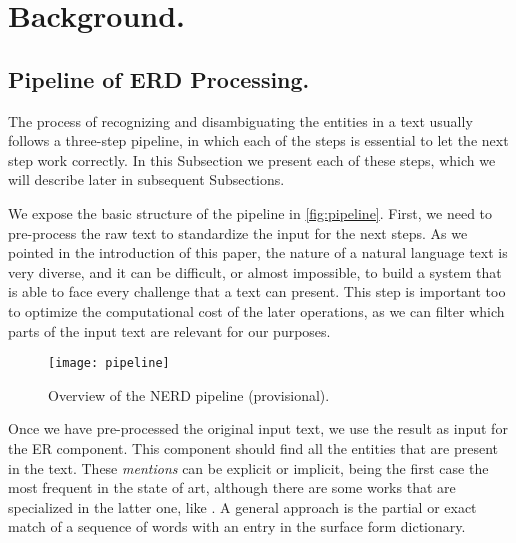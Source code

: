 \section{Background.}
\label{sec:background}

\subsection{Pipeline of ERD Processing.}

The process of recognizing and disambiguating the entities in a text usually follows a three-step pipeline, in which each of the steps is essential to let the next step work correctly. In this Subsection we present each of these steps, which we will describe later in subsequent Subsections.

We expose the basic structure of the pipeline in \autoref{fig:pipeline}. First, we need to pre-process the raw text to standardize the input for the next steps. As we pointed in the introduction of this paper, the nature of a natural language text is very diverse, and it can be difficult, or almost impossible, to build a system that is able to face every challenge that a text can present. This step is important too to optimize the computational cost of the later operations, as we can filter which parts of the input text are relevant for our purposes.

\begin{figure}[!ht]
\centering
\texttt{[image: pipeline]}

\caption{Overview of the NERD pipeline {\color{red}(provisional)}.}
\label{fig:pipeline}
\end{figure}%

\begin{comment}
Once we have pre-processed the original input text, we use the result as input for the ER component. This component has two main goals that carries out sequentially: first, it detects which words or expressions are able to represent one or more entities in that text. This expressions are usually called \emph{mentions}. This is not a trivial operation: some words may or may not be a mention depending on the surrounding text, as we will see later; and it can be some mentions that our system cannot be able to recognise as such. After this step, a generic NER module should be able to gather a list of candidate entities from the knowledge base for each one of the detected mentions.
\end{comment}

Once we have pre-processed the original input text, we use the result as input for the ER component. This component should find all the entities that are present in the text. These \emph{mentions} can be explicit or implicit, being the first case the most frequent in the state of art, although there are some works that are specialized in the latter one, like \cite{perera2016}. A general approach is the partial or exact match of a sequence of words with an entry in the surface form dictionary. 

